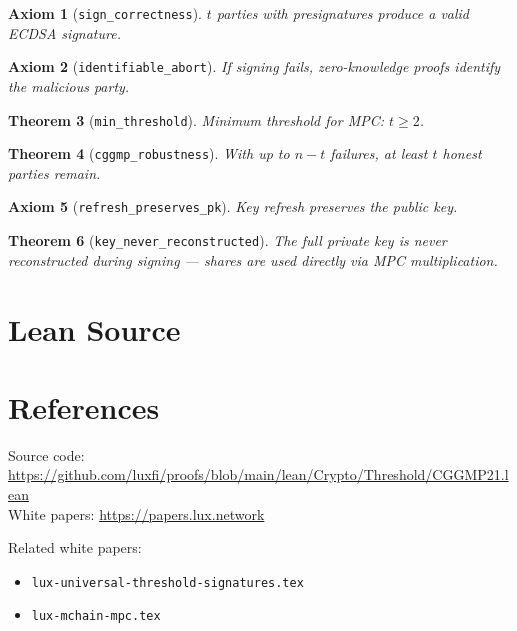 \documentclass[11pt]{article}
\newtheorem{theorem}{Theorem}
\newtheorem{axiom_stmt}[theorem]{Axiom}
\begin{document}
\begin{axiom_stmt}[\texttt{sign\_correctness}]
$t$ parties with presignatures produce a valid ECDSA signature.
\end{axiom_stmt}

\begin{axiom_stmt}[\texttt{identifiable\_abort}]
If signing fails, zero-knowledge proofs identify the malicious party.
\end{axiom_stmt}

\begin{theorem}[\texttt{min\_threshold}]
Minimum threshold for MPC: $t \geq 2$.
\end{theorem}

\begin{theorem}[\texttt{cggmp\_robustness}]
With up to $n-t$ failures, at least $t$ honest parties remain.
\end{theorem}

\begin{axiom_stmt}[\texttt{refresh\_preserves\_pk}]
Key refresh preserves the public key.
\end{axiom_stmt}

\begin{theorem}[\texttt{key\_never\_reconstructed}]
The full private key is never reconstructed during signing --- shares are used directly via MPC multiplication.
\end{theorem}


\section{Lean Source}


\section{References}
\noindent Source code: \url{https://github.com/luxfi/proofs/blob/main/lean/Crypto/Threshold/CGGMP21.lean}\\
\noindent White papers: \url{https://papers.lux.network}

\noindent Related white papers:
\begin{itemize}
  \item \texttt{lux-universal-threshold-signatures.tex}
  \item \texttt{lux-mchain-mpc.tex}
\end{itemize}
\end{document}
